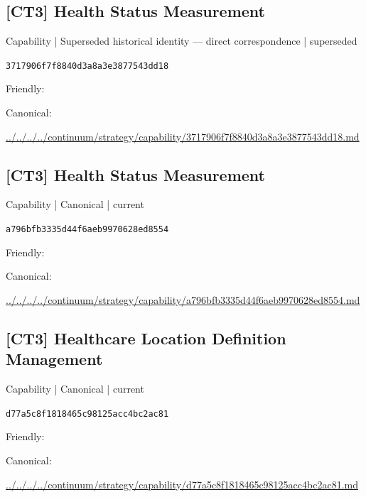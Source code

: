 \documentclass[10pt,a4paper]{article}
\begin{document}
\subsection*{[CT3] Health Status Measurement}
{\small Capability | Superseded historical identity — direct correspondence | superseded}\par
\texttt{3717906f7f8840d3a8a3e3877543dd18}\par
Friendly: \par
Canonical: \par
{\footnotesize\url{../../../../continuum/strategy/capability/3717906f7f8840d3a8a3e3877543dd18.md}}\par
\subsection*{[CT3] Health Status Measurement}
{\small Capability | Canonical | current}\par
\texttt{a796bfb3335d44f6aeb9970628ed8554}\par
Friendly: \par
Canonical: \par
{\footnotesize\url{../../../../continuum/strategy/capability/a796bfb3335d44f6aeb9970628ed8554.md}}\par
\subsection*{[CT3] Healthcare Location Definition Management}
{\small Capability | Canonical | current}\par
\texttt{d77a5c8f1818465c98125acc4bc2ac81}\par
Friendly: \par
Canonical: \par
{\footnotesize\url{../../../../continuum/strategy/capability/d77a5c8f1818465c98125acc4bc2ac81.md}}\par
\end{document}
